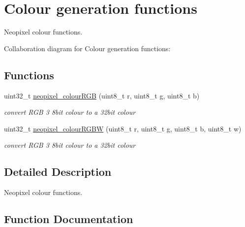 \hypertarget{group___neo_pixel___colour}{}\section{Colour generation functions}
\label{group___neo_pixel___colour}


Neopixel colour functions.  


Collaboration diagram for Colour generation functions\+:
\subsection*{Functions}
\begin{DoxyCompactItemize}
\item 
uint32\+\_\+t \hyperlink{group___neo_pixel___colour_ga1d500fbcbecad76feef8835437687ca0}{neopixel\+\_\+colour\+R\+GB} (uint8\+\_\+t r, uint8\+\_\+t g, uint8\+\_\+t b)
\begin{DoxyCompactList}\small\item\em convert R\+GB 3 8bit colour to a 32bit colour \end{DoxyCompactList}\item 
uint32\+\_\+t \hyperlink{group___neo_pixel___colour_ga527ba03b45a249e5e1ea1da4b971b3ac}{neopixel\+\_\+colour\+R\+G\+BW} (uint8\+\_\+t r, uint8\+\_\+t g, uint8\+\_\+t b, uint8\+\_\+t w)
\begin{DoxyCompactList}\small\item\em convert R\+GB 3 8bit colour to a 32bit colour \end{DoxyCompactList}\end{DoxyCompactItemize}


\subsection{Detailed Description}
Neopixel colour functions. 



\subsection{Function Documentation}
\mbox{\label{group___neo_pixel___colour_ga1d500fbcbecad76feef8835437687ca0}} 
